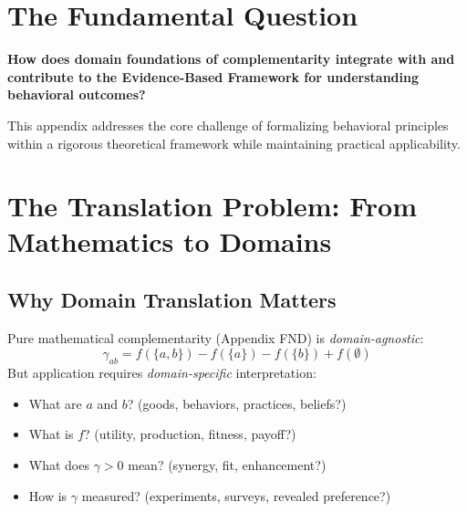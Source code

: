 \section{The Fundamental Question}
\label{sec:dfn-fundamental}

\begin{tcolorbox}[
    colback=red!5!white,
    colframe=red!75!black,
    title={\textbf{Fundamental Question}}
]
\textbf{How does domain foundations of complementarity integrate with and contribute to the
Evidence-Based Framework for understanding behavioral outcomes?}

This appendix addresses the core challenge of formalizing behavioral principles
within a rigorous theoretical framework while maintaining practical applicability.
\end{tcolorbox}


\section{The Translation Problem: From Mathematics to Domains}
\label{sec:translation}

\subsection{Why Domain Translation Matters}

\begin{tcolorbox}[colback=yellow!5!white,colframe=yellow!75!black,title=\textbf{The Central Challenge}]
Pure mathematical complementarity (Appendix FND) is \textit{domain-agnostic}:
\begin{equation}
\gamma_{ab} = f(\{a,b\}) - f(\{a\}) - f(\{b\}) + f(\emptyset)
\end{equation}
But application requires \textit{domain-specific} interpretation:
\begin{itemize}[noitemsep]
    \item What are $a$ and $b$? (goods, behaviors, practices, beliefs?)
    \item What is $f$? (utility, production, fitness, payoff?)
    \item What does $\gamma > 0$ mean? (synergy, fit, enhancement?)
    \item How is $\gamma$ measured? (experiments, surveys, revealed preference?)
\end{itemize}
\end{tcolorbox}


